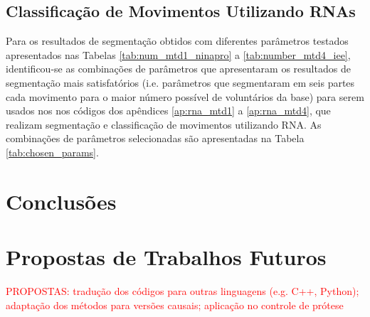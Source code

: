 		\section{Classificação de Movimentos Utilizando RNAs}
Para os resultados de segmentação obtidos com diferentes parâmetros testados apresentados nas Tabelas \ref{tab:num_mtd1_ninapro} a \ref{tab:number_mtd4_iee}, identificou-se as combinações de parâmetros que apresentaram os resultados de segmentação mais satisfatórios (i.e. parâmetros que segmentaram em seis partes cada movimento para o maior número possível de voluntários da base) para serem usados nos nos códigos dos apêndices \ref{ap:rna_mtd1} a \ref{ap:rna_mtd4}, que realizam segmentação e classificação de movimentos utilizando RNA. As combinações de parâmetros selecionadas são apresentadas na Tabela \ref{tab:chosen_params}.



	\chapter{Conclusões}

	\chapter{Propostas de Trabalhos Futuros}

\textcolor{red}{PROPOSTAS: tradução dos códigos para outras linguagens (e.g. C++, Python); adaptação dos métodos para versões causais; aplicação no controle de prótese}

	\postextual
	

